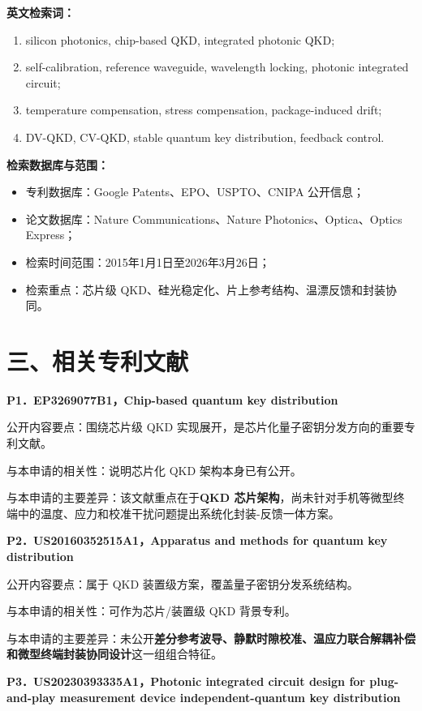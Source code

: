 \documentclass[12pt,a4paper]{article}
\begin{document}
\textbf{英文检索词：}
\begin{enumerate}[label=(\arabic*)]
    \item silicon photonics, chip-based QKD, integrated photonic QKD;
    \item self-calibration, reference waveguide, wavelength locking, photonic integrated circuit;
    \item temperature compensation, stress compensation, package-induced drift;
    \item DV-QKD, CV-QKD, stable quantum key distribution, feedback control.
\end{enumerate}

\textbf{检索数据库与范围：}
\begin{itemize}[leftmargin=2em]
    \item 专利数据库：Google Patents、EPO、USPTO、CNIPA 公开信息；
    \item 论文数据库：Nature Communications、Nature Photonics、Optica、Optics Express；
    \item 检索时间范围：2015年1月1日至2026年3月26日；
    \item 检索重点：芯片级 QKD、硅光稳定化、片上参考结构、温漂反馈和封装协同。
\end{itemize}

\section*{三、相关专利文献}

\textbf{P1．EP3269077B1，Chip-based quantum key distribution}

公开内容要点：围绕芯片级 QKD 实现展开，是芯片化量子密钥分发方向的重要专利文献。

与本申请的相关性：说明芯片化 QKD 架构本身已有公开。

与本申请的主要差异：该文献重点在于\textbf{QKD 芯片架构}，尚未针对手机等微型终端中的温度、应力和校准干扰问题提出系统化封装-反馈一体方案。

\vspace{0.5em}
\textbf{P2．US20160352515A1，Apparatus and methods for quantum key distribution}

公开内容要点：属于 QKD 装置级方案，覆盖量子密钥分发系统结构。

与本申请的相关性：可作为芯片/装置级 QKD 背景专利。

与本申请的主要差异：未公开\textbf{差分参考波导、静默时隙校准、温应力联合解耦补偿和微型终端封装协同设计}这一组组合特征。

\vspace{0.5em}
\textbf{P3．US20230393335A1，Photonic integrated circuit design for plug-and-play measurement device independent-quantum key distribution}
\end{document}

